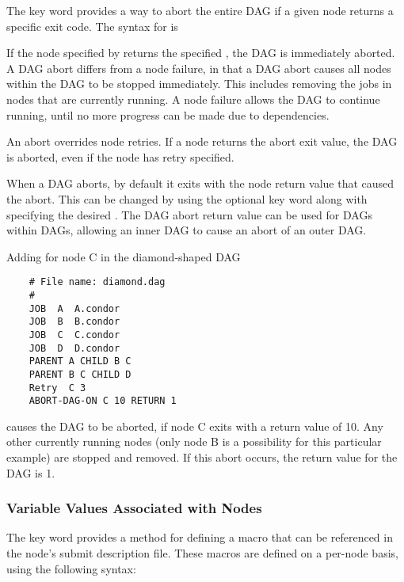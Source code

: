 The  key word provides a way
to abort the entire DAG if a given node returns a specific exit
code.  The syntax for  is

  

If the node specified by  returns the specified
, the
DAG is immediately aborted.
A DAG abort differs from a node failure,
in that a DAG abort causes all nodes within the DAG to be stopped immediately.
This includes removing the jobs in nodes that are currently running.
A node failure allows the DAG to continue running,
until no more progress can be made due to dependencies.

An abort overrides node retries. 
If a node returns the abort exit value,
the DAG is aborted,
even if the node has retry specified.

When a DAG aborts, by default it exits with the node return value that
caused the abort.  This can be changed by 
using  the optional  key word along
with specifying the desired .
The DAG abort return value
can be used for DAGs within DAGs,
allowing an inner DAG to cause an abort of an outer DAG.

Adding  for node C in the diamond-shaped
DAG
\footnotesize
\begin{verbatim}
    # File name: diamond.dag
    #
    JOB  A  A.condor 
    JOB  B  B.condor 
    JOB  C  C.condor	
    JOB  D  D.condor
    PARENT A CHILD B C
    PARENT B C CHILD D
    Retry  C 3
    ABORT-DAG-ON C 10 RETURN 1
\end{verbatim}
\normalsize

causes the DAG to be aborted, if node C exits with a return value of 10.
Any other currently running nodes (only node B is a possibility for 
this particular example) are stopped and removed.
If this abort occurs, the return value for the DAG is 1.


\subsubsection{\label{dagman:VARS}Variable Values Associated with Nodes}

The  key word provides a
method for defining a macro that can be referenced in the
node's submit description file.
These macros are defined on a per-node basis, using the
following syntax:

